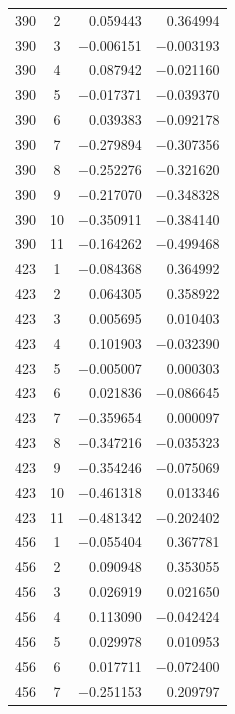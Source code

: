 \documentclass[12pt,a4paper,twoside]{article}
\numberwithin{equation}{section}
\begin{document}
{\begin{longtable}{cc rr}
    390 & 2 & 0.059443 & 0.364994 \\
    390 & 3 & \ensuremath{-}0.006151 & \ensuremath{-}0.003193 \\
    390 & 4 & 0.087942 & \ensuremath{-}0.021160 \\
    390 & 5 & \ensuremath{-}0.017371 & \ensuremath{-}0.039370 \\
    390 & 6 & 0.039383 & \ensuremath{-}0.092178 \\
    390 & 7 & \ensuremath{-}0.279894 & \ensuremath{-}0.307356 \\
    390 & 8 & \ensuremath{-}0.252276 & \ensuremath{-}0.321620 \\
    390 & 9 & \ensuremath{-}0.217070 & \ensuremath{-}0.348328 \\
    390 & 10 & \ensuremath{-}0.350911 & \ensuremath{-}0.384140 \\
    390 & 11 & \ensuremath{-}0.164262 & \ensuremath{-}0.499468 \\
    423 & 1 & \ensuremath{-}0.084368 & 0.364992 \\
    423 & 2 & 0.064305 & 0.358922 \\
    423 & 3 & 0.005695 & 0.010403 \\
    423 & 4 & 0.101903 & \ensuremath{-}0.032390 \\
    423 & 5 & \ensuremath{-}0.005007 & 0.000303 \\
    423 & 6 & 0.021836 & \ensuremath{-}0.086645 \\
    423 & 7 & \ensuremath{-}0.359654 & 0.000097 \\
    423 & 8 & \ensuremath{-}0.347216 & \ensuremath{-}0.035323 \\
    423 & 9 & \ensuremath{-}0.354246 & \ensuremath{-}0.075069 \\
    423 & 10 & \ensuremath{-}0.461318 & 0.013346 \\
    423 & 11 & \ensuremath{-}0.481342 & \ensuremath{-}0.202402 \\
    456 & 1 & \ensuremath{-}0.055404 & 0.367781 \\
    456 & 2 & 0.090948 & 0.353055 \\
    456 & 3 & 0.026919 & 0.021650 \\
    456 & 4 & 0.113090 & \ensuremath{-}0.042424 \\
    456 & 5 & 0.029978 & 0.010953 \\
    456 & 6 & 0.017711 & \ensuremath{-}0.072400 \\
    456 & 7 & \ensuremath{-}0.251153 & 0.209797 \\

\end{longtable}}
\end{document}
